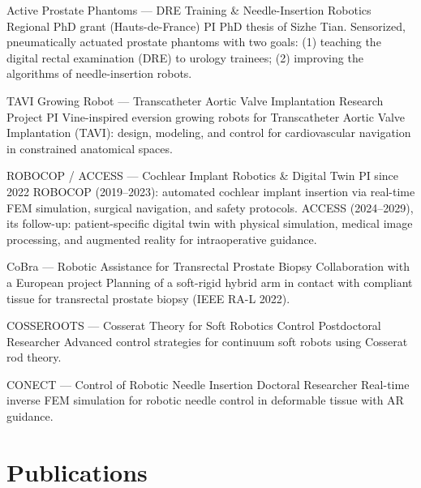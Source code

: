 \documentclass[11pt,a4paper,sans]{moderncv}
\begin{document}
%
  {Active Prostate Phantoms --- DRE Training \& Needle-Insertion Robotics}%
  {Regional PhD grant (Hauts-de-France) \textperiodcentered{} PI}{}{}%
  {PhD thesis of Sizhe Tian. Sensorized, pneumatically actuated prostate phantoms with two goals: (1) teaching the digital rectal examination (DRE) to urology trainees; (2) improving the algorithms of needle-insertion robots.}

%
  {TAVI Growing Robot --- Transcatheter Aortic Valve Implantation}%
  {Research Project \textperiodcentered{} PI}{}{}%
  {Vine-inspired eversion growing robots for Transcatheter Aortic Valve Implantation (TAVI): design, modeling, and control for cardiovascular navigation in constrained anatomical spaces.}

%
  {ROBOCOP / ACCESS --- Cochlear Implant Robotics \& Digital Twin}%
  {PI since 2022}{}{}%
  {ROBOCOP (2019--2023): automated cochlear implant insertion via real-time FEM simulation, surgical navigation, and safety protocols. ACCESS (2024--2029), its follow-up: patient-specific digital twin with physical simulation, medical image processing, and augmented reality for intraoperative guidance.}

\cventry{}%
  {CoBra --- Robotic Assistance for Transrectal Prostate Biopsy}%
  {Collaboration with a European project}{}{}%
  {Planning of a soft-rigid hybrid arm in contact with compliant tissue for transrectal prostate biopsy (IEEE RA-L 2022).}

%
  {COSSEROOTS --- Cosserat Theory for Soft Robotics Control}%
  {Postdoctoral Researcher}{}{}%
  {Advanced control strategies for continuum soft robots using Cosserat rod theory.}

%
  {CONECT --- Control of Robotic Needle Insertion}%
  {Doctoral Researcher}{}{}%
  {Real-time inverse FEM simulation for robotic needle control in deformable tissue with AR guidance.}

\section{Publications}

\end{document}
